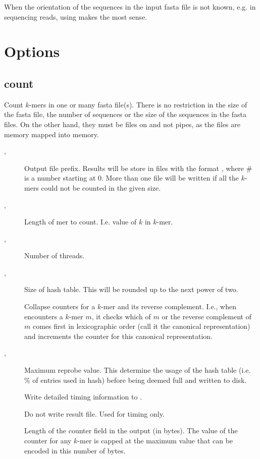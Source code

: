 \documentclass[english]{article}
\begin{document}
When the orientation of the sequences in the input fasta file is not
known, e.g. in sequencing reads, using  makes the most sense.

\section{Options}

\subsection{count}

Count $k$-mers in one or many fasta file(s). There is no restriction
in the size of the fasta file, the number of sequences or the size of
the sequences in the fasta files. On the other hand, they must be
files on and not pipes, as the files are memory mapped into memory.

\begin{description}
\item[,] Output file prefix. Results will be store
  in files with the format , where \# is a number
  starting at 0. More than one file will be written if all the
  $k$-mers could not be counted in the given size.
\item[,] Length of mer to
  count. I.e. value of $k$ in $k$-mer.
\item[,] Number of threads.
\item[,] Size of hash table. This
  will be rounded up to the next power of two.
\item[] Collapse counters for a $k$-mer and its
  reverse complement. I.e., when  encounters a $k$-mer
  $m$, it checks which of $m$ or the reverse complement of $m$ comes
  first in lexicographic order (call it the canonical representation)
  and increments the counter for this canonical representation.
\item[,] Maximum reprobe
  value. This determine the usage of the hash table (i.e. \% of
  entries used in hash) before being deemed full and written to disk.
\item[] Write detailed timing information to
  .
\item[] Do not write result file. Used for timing only.
\item[] Length of the counter field in
  the output (in bytes). The value of the counter for any $k$-mer is
  capped at the maximum value that can be encoded in this number of
  bytes.
\end{description}
\end{document}
